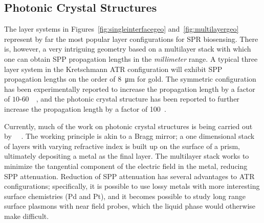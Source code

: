 \subsection{Photonic Crystal Structures}
The layer systems in Figures~\ref{fig:singleinterfacegeo}
and~\ref{fig:multilayergeo} represent by far the most popular layer
configurations for SPR biosensing.  There is, however, a very intriguing
geometry based on a multilayer stack with which one can obtain SPP
propagation lengths in the \textit{millimeter} range.  A typical three
layer system in the Kretschmann ATR configuration will exhibit SPP
propagation lengths on the order of \SI{8}{\micro\meter} for gold.  The
symmetric configuration has been experimentally reported to increase the
propagation length by a factor of
$10$-$60$~\cite{kuwamura1983experimental}~\cite{craig1983experimental}, and
the photonic crystal structure has been reported to further increase the
propagation length by a factor of 100~\cite{konopsky2009long}.

Currently, much of the work on photonic crystal structures is being carried
out by ~\cite{konopsky2006long}~\cite{konopsky2009long}.
The working principle is akin to a Bragg mirror; a one dimensional stack of
layers with varying refractive index is built up on the surface of a prism,
ultimately depositing a metal as the final layer.  The multilayer stack
works to minimize the tangential component of the electric field in the
metal, reducing SPP attenuation.  Reduction of SPP attenuation has several
advantages to ATR configurations; specifically, it is possible to use lossy metals with
more interesting surface chemistries (Pd and Pt), and it becomes possible
to study long range surface plasmons with near field probes, which the
liquid phase would otherwise make difficult.
